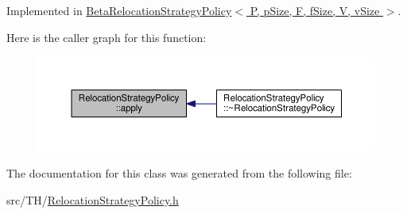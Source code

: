 Implemented in \hyperlink{classBetaRelocationStrategyPolicy_aeadaa254d012725ab1a67419d9cb37ef}{Beta\+Relocation\+Strategy\+Policy$<$ P, p\+Size, F, f\+Size, V, v\+Size $>$}.



Here is the caller graph for this function\+:
\nopagebreak
\begin{figure}[H]
\begin{center}
\leavevmode
\includegraphics[width=350pt]{classRelocationStrategyPolicy_ab1de627ca81a24739d942806cfed27e0_icgraph}
\end{center}
\end{figure}




The documentation for this class was generated from the following file\+:\begin{DoxyCompactItemize}
\item 
src/\+T\+H/\hyperlink{RelocationStrategyPolicy_8h}{Relocation\+Strategy\+Policy.\+h}\end{DoxyCompactItemize}
